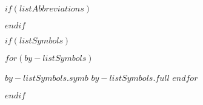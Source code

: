 \frontmatter

\buildFrontPages

$if(listAbbreviations)$



$endif$


$if(listSymbols)$
\begin{listSymbols}
$for(by-listSymbols)$
  \item[$by-listSymbols.symb$] $by-listSymbols.full$
$endfor$
\end{listSymbols}
$endif$

\mainmatter
